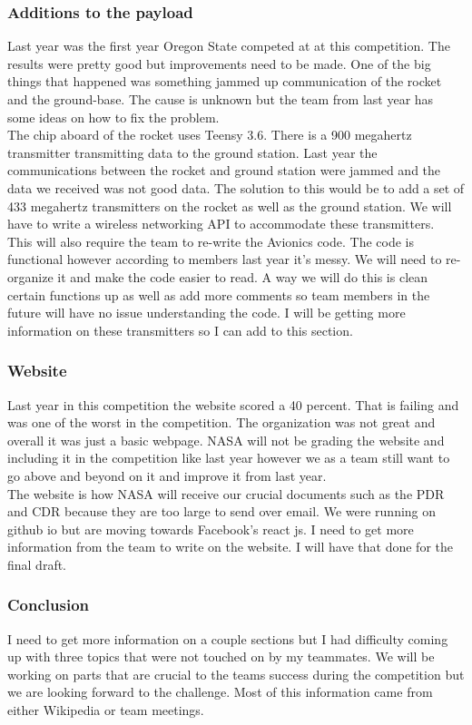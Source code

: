\documentclass[onecolumn, draftclsnofoot, 10pt, compsoc]{IEEEtran}
\begin{document}
\subsubsection{Additions to the payload}
Last year was the first year Oregon State competed at at this competition. The results were pretty good but improvements need to be made. One of the big things that happened was something jammed up communication of the rocket and the ground-base. The cause is unknown but the team from last year has some ideas on how to fix the problem. \\
The chip aboard of the rocket uses Teensy 3.6. There is a 900 megahertz transmitter transmitting data to the ground station. Last year the communications between the rocket and ground station were jammed and the data we received was not good data. The solution to this would be to add a set of 433 megahertz transmitters on the rocket as well as the ground station. We will have to write a wireless networking API to accommodate these transmitters. \\ 
This will also require the team to re-write the Avionics code. The code is functional however according to members last year it's messy. We will need to re-organize it and make the code easier to read. A way we will do this is clean certain functions up as well as add more comments so team members in the future will have no issue understanding the code. I will be getting more information on these transmitters so I can add to this section. 

\subsubsection{Website}
Last year in this competition the website scored a 40 percent. That is failing and was one of the worst in the competition. The organization was not great and overall it was just a basic webpage. NASA will not be grading the website and including it in the competition like last year however we as a team still want to go above and beyond on it and improve it from last year. \\
The website is how NASA will receive our crucial documents such as the PDR and CDR because they are too large to send over email. We were running on github io but are moving towards Facebook's react js. I need to get more information from the team to write on the website. I will have that done for the final draft. 

\subsubsection{Conclusion}
I need to get more information on a couple sections but I had difficulty coming up with three topics that were not touched on by my teammates. We will be working on parts that are crucial to the teams success during the competition but we are looking forward to the challenge. Most of this information came from either Wikipedia or team meetings.
\end{document}
